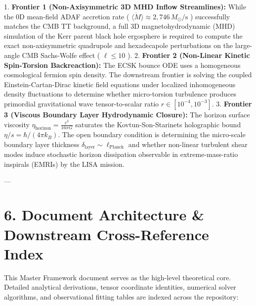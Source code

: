 \documentclass[11pt,a4paper]{article}
\theoremstyle{definition}
\theoremstyle{remark}
\begin{document}
1. \textbf{Frontier 1 (Non-Axisymmetric 3D MHD Inflow Streamlines):} While the 0D mean-field ADAF accretion rate ( $\langle \dot{M} \rangle \approx 2{,}746 \, M_\odot/\text{s}$ ) successfully matches the CMB TT background, a full 3D magnetohydrodynamic (MHD) simulation of the Kerr parent black hole ergosphere is required to compute the exact non-axisymmetric quadrupole and hexadecapole perturbations on the large-angle CMB Sachs-Wolfe effect ( $\ell \le 10$ ).
2. \textbf{Frontier 2 (Non-Linear Kinetic Spin-Torsion Backreaction):} The ECSK bounce ODE uses a homogeneous cosmological fermion spin density. The downstream frontier is solving the coupled Einstein-Cartan-Dirac kinetic field equations under localized inhomogeneous density fluctuations to determine whether micro-torsion turbulence produces primordial gravitational wave tensor-to-scalar ratio $r \in [10^{-4}, 10^{-3}]$.
3. \textbf{Frontier 3 (Viscous Boundary Layer Hydrodynamic Closure):} The horizon surface viscosity $\eta_{\text{horizon}} = \frac{c^3}{16\pi G}$ saturates the Kovtun-Son-Starinets holographic bound $\eta/s = \hbar/(4\pi k_B)$. The open boundary condition is determining the micro-scale boundary layer thickness $\delta_{\text{layer}} \sim \ell_{\text{Planck}}$ and whether non-linear turbulent shear modes induce stochastic horizon dissipation observable in extreme-mass-ratio inspirals (EMRIs) by the LISA mission.

---

\section{6. Document Architecture \& Downstream Cross-Reference Index}

This Master Framework document serves as the high-level theoretical core. Detailed analytical derivations, tensor coordinate identities, numerical solver algorithms, and observational fitting tables are indexed across the repository:
\end{document}
